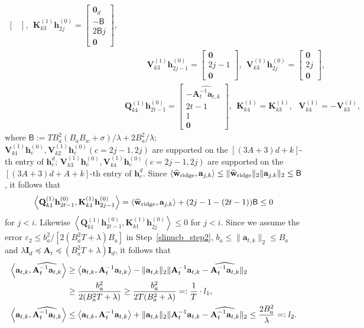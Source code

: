 \documentclass[10pt]{article}
\renewcommand{\hat}{\widehat}
\newcommand{\id}{\bI}
\newcommand{\eps}{\varepsilon}
\newcommand{\<}{\left\langle}
\renewcommand{\>}{\right\rangle}
\renewcommand{\bQ}{\mathbf{Q}}
\newcommand{\bzero}{{\mathbf 0}}
\newcommand{\ridge}{{\rm ridge}}
\newcommand{\partd}{{d}}
\newcommand{\lran}{{l_1}}
\newcommand{\uran}{{l_2}}
\newcommand{\tfthres}{{\mathsf{B}}}
\def\bA{{\mathbf A}}
\def\bI{{\mathbf I}}
\def\bK{{\mathbf K}}
\def\bQ{{\mathbf Q}}
\def\bV{{\mathbf V}}
\def\ba{{\mathbf a}}
\def\bh{{\mathbf h}}
\def\bw{{\mathbf w}}
\begin{document}
\begin{align*}
\begin{bmatrix}
    \end{bmatrix},~~
    \bK^{(1)}_{k3}\bh^{(0)}_{2j}=\begin{bmatrix}
        \bzero_d\\  -\tfthres \\ 2\tfthres j\\\bzero
    \end{bmatrix},\\
    &
    \qquad~~~ \bV^{(1)}_{k3}\bh^{(0)}_{2j-1}=\begin{bmatrix}
        \bzero\\ 2j-1 \\ \bzero
    \end{bmatrix},~~ \bV^{(1)}_{k3}\bh^{(0)}_{2j}=\begin{bmatrix}
        \bzero\\ 2j \\ \bzero
    \end{bmatrix},\\
    &
    \bQ^{(1)}_{k4}\bh^{(0)}_{2t-1}=\begin{bmatrix}
        - \widehat{\bA_t^{-1}\ba_{t,k}} \\2t-1\\1\\\bzero
    \end{bmatrix},~~  \bK^{(1)}_{k4}=\bK^{(1)}_{k3},~~  \ \bV^{(1)}_{k4}=-\bV^{(1)}_{k3},
\end{align*}
where $\tfthres:=TB_a^2(B_aB_w+\sigma)/\lambda+2B_a^2/\lambda$; $\bV^{(1)}_{k1}\bh^{(0)}_{c},\bV^{(1)}_{k2}\bh^{(0)}_{c} (c=2j-1,2j)$ are supported on the $[(3A+3)d+k]$-th entry of $\bh_c^{\partd}$; $\bV^{(1)}_{k3}\bh^{(0)}_{c},\bV^{(1)}_{k4}\bh^{(0)}_{c} (c=2j-1,2j)$ are supported on the $[(3A+3)d+A+k]$-th entry of $\bh_c^{\partd}$.
Since $\<\hat\bw_{\ridge},\ba_{j,k}\>\leq \|\hat\bw_{\ridge}\|_2\|\ba_{j,k}\|_2\leq\tfthres$, it follows that $$\<\bQ^{(1)}_{k1}\bh^{(0)}_{2t-1},\bK^{(1)}_{k1}\bh^{(0)}_{2j-1}\>=\<\hat\bw_{\ridge},\ba_{j,k}\>+(2j-1-(2t-1))\tfthres\leq 0$$ for $j<i$. Likewise $\<\bQ^{(1)}_{k1}\bh^{(0)}_{2t-1},\bK^{(1)}_{k1}\bh^{(0)}_{2j}\>\leq0$ for $j<i$.
Since we assume the error $\eps_2\leq b_a^2/[2(B_a^2T+\lambda)B_a]$
in Step~\ref{slinucb_step2}, $b_a\leq\|\ba_{t,k}\|_2\leq B_a$ and $\lambda\id_d\preceq\bA_t\preceq (B_a^2T+\lambda)\id_d$, it follows that
\begin{align}
    \<\ba_{t,k},\widehat{\bA_t^{-1}\ba_{t,k}}\>
    &\geq
    \<\ba_{t,k},{\bA_t^{-1}\ba_{t,k}}\>-\|\ba_{t,k}\|_2\|\bA_t^{-1}\ba_{t,k}-\widehat{\bA_t^{-1}\ba_{t,k}}\|_2\notag\\
    &\geq \frac{b_a^2}{2(B_a^2T+\lambda)}\geq \frac{b_a^2}{2T(B_a^2+\lambda)}=:\frac{1}{T}\cdot{\lran},\label{eq:lb_qudratic}
    \\
     \<\ba_{t,k},\widehat{\bA_t^{-1}\ba_{t,k}}\>
     &\leq
     \<\ba_{t,k},{\bA_t^{-1}\ba_{t,k}}\>+\|\ba_{t,k}\|_2\|\bA_t^{-1}\ba_{t,k}-\widehat{\bA_t^{-1}\ba_{t,k}}\|_2\leq \frac{2B_a^2}{\lambda}=:\uran.\label{eq:ub_qudratic}
\end{align}
\end{document}
